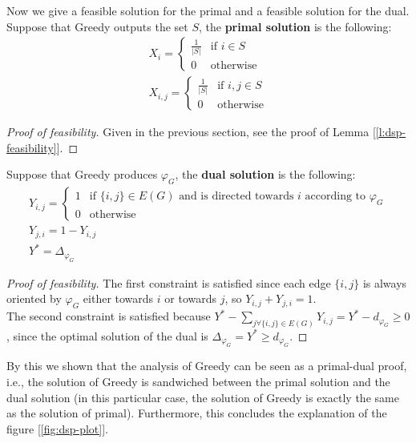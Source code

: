 Now we give a feasible solution for the primal and a feasible solution for the dual.\\
Suppose that Greedy outputs the set $S$, the \textbf{primal solution} is the following:
\begin{equation}
    \begin{aligned}
    &X_i =
    \begin{cases}
        \frac{1}{|S|} & \text{if } i \in S\\
        0             & \text{otherwise}
    \end{cases}&\\
    &X_{i,j} =
    \begin{cases}
        \frac{1}{|S|} & \text{if } i,j \in S\\
        0             & \text{otherwise}
    \end{cases}&
    \end{aligned}
\end{equation}
\begin{proof}[Proof of feasibility]
    Given in the previous section, see the proof of Lemma [\ref{l:dsp-feasibility}].
\end{proof}
Suppose that Greedy produces $\varphi_G$, the \textbf{dual solution} is the following:
\begin{equation}
    \begin{aligned}
        &Y_{i,j} =
        \begin{cases}
            1 & \text{if } \{i,j\} \in E(G) \text{ and is directed towards } i \text{ according to } \varphi_G\\
            0 & \text{otherwise}
        \end{cases}&\\
        &Y_{j,i} = 1 - Y_{i,j}&\\
        &Y^* = \Delta_{\varphi_G}&
    \end{aligned}
\end{equation}
\begin{proof}[Proof of feasibility]
    The first constraint is satisfied since each edge $\{i,j\}$ is always oriented by $\varphi_G$ either towards $i$ or towards $j$, so $Y_{i,j} + Y_{j,i} = 1$.\\
    The second constraint is satisfied because $Y^* - \sum_{j \forall \{i,j\} \in E(G)} Y_{i, j} = Y^* - d_{\varphi_G} \geq 0$, since the optimal solution of the dual is $\Delta_{\varphi_G} = Y^* \geq d_{\varphi_G}$.
\end{proof}

By this we shown that the analysis of Greedy can be seen as a primal-dual proof, i.e., the solution of Greedy is sandwiched between the primal solution and the dual solution (in this particular case, the solution of Greedy is exactly the same as the solution of primal). Furthermore, this concludes the explanation of the figure [\ref{fig:dsp-plot}].

